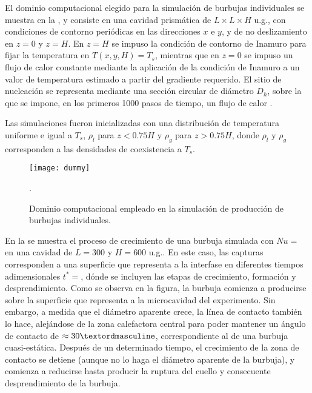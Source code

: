 El dominio computacional elegido para la simulaci\'on de burbujas individuales se muestra en la , y consiste en una cavidad prism\'atica de $L \times L \times H$ u.g., con condiciones de contorno peri\'odicas en las direcciones $x$ e $y$, y de no deslizamiento en $z=0$ y $z=H$. En $z=H$ se impuso la condici\'on de contorno de Inamuro para fijar la temperatura en $T(x,y,H) = T_s$, mientras que en $z=0$ se impuso un flujo de calor constante mediante la aplicaci\'on de la condici\'on de Inamuro a un valor de temperatura estimado a partir del gradiente requerido. El sitio de nucleaci\'on se representa mediante una secci\'on circular de di\'ametro $D_h$, sobre la que se impone, en los primeros 1000 pasos de tiempo, un flujo de calor .

Las simulaciones fueron inicializadas con una distribuci\'on de temperatura uniforme e igual a $T_s$, $\rho_l$ para $z<0.75H$ y $\rho_g$ para $z>0.75H$, donde $\rho_l$ y $\rho_g$ corresponden a las densidades de coexistencia a $T_s$.

\begin{figure}[ht]
	\centering
	\texttt{[image: dummy]}
	\caption{Dominio computacional empleado en la simulaci\'on de producci\'on de burbujas individuales.}.
	\label{fig:dominio_hutter}
\end{figure}


En la  se muestra el proceso de crecimiento de una burbuja  simulada con $Nu=$ en una cavidad de $L=300$ y $H=600$ u.g.. En este caso, las capturas corresponden a una superficie que representa a la interfase en diferentes tiempos adimensionales $t^*=$, d\'onde se incluyen las etapas de crecimiento, formaci\'on y desprendimiento. Como se observa en la figura, la burbuja comienza a producirse sobre la superficie que representa a la microcavidad del experimento. Sin embargo, a medida que el di\'ametro aparente crece, la l\'inea de contacto tambi\'en lo hace, alej\'andose de la zona calefactora central para poder mantener un \'angulo de contacto de $\approx 30\textordmasculine$, correspondiente al de una burbuja cuasi-est\'atica. Despu\'es de un determinado tiempo, el crecimiento de la zona de contacto se detiene (aunque no lo haga el di\'ametro aparente de la burbuja), y comienza a reducirse hasta producir la ruptura del cuello y consecuente desprendimiento de la burbuja. 

